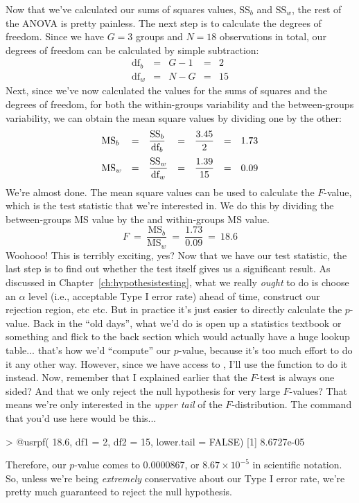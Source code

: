 Now that we've calculated our sums of squares values, $\mbox{SS}_b$ and $\mbox{SS}_w$, the rest of the ANOVA is pretty painless. The next step is to calculate the degrees of freedom. Since we have $G = 3$ groups and $N = 18$ observations in total, our degrees of freedom can be calculated by simple subtraction:
$$
\begin{array}{lclcl}
\mbox{df}_b &=& G - 1 &=& 2 \\
\mbox{df}_w &=& N - G &=& 15 
\end{array}
$$
Next, since we've now calculated the values for the sums of squares and the degrees of freedom, for both the within-groups variability and the between-groups variability, we can obtain the mean square values by dividing one by the other:
$$
\begin{array}{lclclcl}
\mbox{MS}_b &=& \displaystyle\frac{\mbox{SS}_b }{  \mbox{df}_b } &=& \displaystyle\frac{3.45}{ 2}  &=& 1.73 \vspace*{6pt} \\ 
\mbox{MS}_w &=& \displaystyle\frac{\mbox{SS}_w }{  \mbox{df}_w } &=& \displaystyle\frac{1.39}{15} &=& 0.09
\end{array}
$$
We're almost done. The mean square values can be used to calculate the $F$-value, which is the test statistic that we're interested in. We do this by dividing the between-groups MS value by the and within-groups MS value.
$$
F \ = \ \frac{\mbox{MS}_b }{ \mbox{MS}_w } \ = \ \frac{1.73}{0.09} \ = \ 18.6
$$
Woohooo! This is terribly exciting, yes? Now that we have our test statistic, the last step is to find out whether the test itself gives us a significant result. As discussed in Chapter~\ref{ch:hypothesistesting}, what we really {\it ought} to do is choose an $\alpha$ level (i.e., acceptable Type I error rate) ahead of time, construct our rejection region, etc etc. But in practice it's just easier to directly calculate the $p$-value. Back in the ``old days'', what we'd do is open up a statistics textbook or something and flick to the back section which would actually have a huge lookup table... that's how we'd ``compute'' our $p$-value, because it's too much effort to do it any other way. However, since we have access to \R, I'll use the  function to do it instead. Now, remember that I explained earlier that the $F$-test is always one sided? And that we only reject the null hypothesis for very large $F$-values? That means we're only interested in the {\it upper tail} of the $F$-distribution. The command that you'd use here would be this...
\begin{rblock1}
> @usr{pf( 18.6, df1 = 2, df2 = 15, lower.tail = FALSE)}
[1] 8.6727e-05
\end{rblock1}
Therefore, our $p$-value comes to 0.0000867, or $8.67 \times 10^{-5}$ in scientific notation. So, unless we're being {\it extremely} conservative about our Type I error rate, we're pretty much guaranteed to reject the null hypothesis. 

